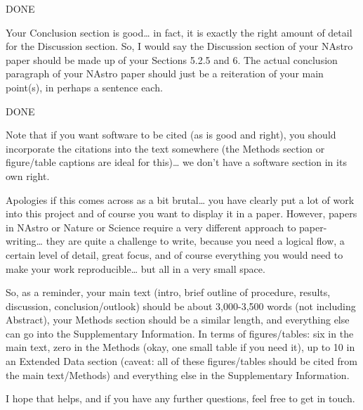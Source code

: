 DONE
 

Your Conclusion section is good… in fact, it is exactly the right amount of detail for the Discussion section. So, I would say the Discussion section of your NAstro paper should be made up of your Sections 5.2.5 and 6. The actual conclusion paragraph of your NAstro paper should just be a reiteration of your main point(s), in perhaps a sentence each.

 DONE

Note that if you want software to be cited (as is good and right), you should incorporate the citations into the text somewhere (the Methods section or figure/table captions are ideal for this)… we don’t have a software section in its own right.

 

Apologies if this comes across as a bit brutal… you have clearly put a lot of work into this project and of course you want to display it in a paper. However, papers in NAstro or Nature or Science require a very different approach to paper-writing… they are quite a challenge to write, because you need a logical flow, a certain level of detail, great focus, and of course everything you would need to make your work reproducible… but all in a very small space.

 

So, as a reminder, your main text (intro, brief outline of procedure, results, discussion, conclusion/outlook) should be about 3,000-3,500 words (not including Abstract), your Methods section should be a similar length, and everything else can go into the Supplementary Information. In terms of figures/tables: six in the main text, zero in the Methods (okay, one small table if you need it), up to 10 in an Extended Data section (caveat: all of these figures/tables should be cited from the main text/Methods) and everything else in the Supplementary Information.

 

I hope that helps, and if you have any further questions, feel free to get in touch.